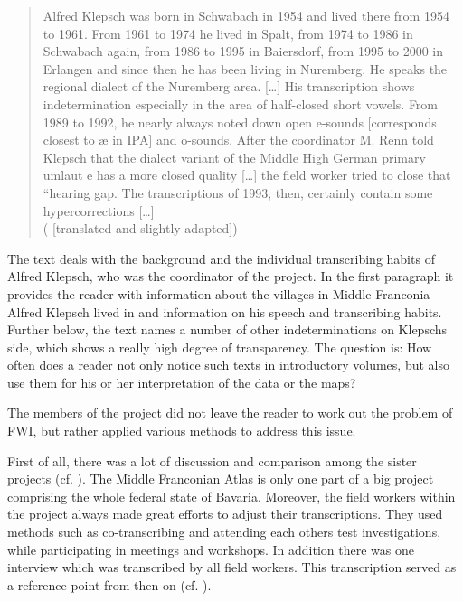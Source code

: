 \documentclass[output=paper]{LSP/langsci}
\begin{document}
\begin{quote}
Alfred Klepsch was born in Schwabach in 1954 and lived there from 1954 to 1961. From 1961 to 1974 he lived in Spalt, from 1974 to 1986 in Schwabach again, from 1986 to 1995 in Baiersdorf, from 1995 to 2000 in Erlangen and since then he has been living in Nuremberg. He speaks the regional dialect of the Nuremberg area. […] His transcription shows indetermination especially in the area of half-closed short vowels. From 1989 to 1992, he nearly always noted down open e-sounds [corresponds closest to æ in IPA] and o-sounds. After the coordinator M. Renn told Klepsch that the dialect variant of the Middle High German primary umlaut e has a more closed quality […] the field worker tried to close that ``hearing gap{\textquotedbl}. The transcriptions of 1993, then, certainly contain some hypercorrections […]\\(\citealt[47]{klepsch_sprachatlas_2013} [translated and slightly adapted])
\end{quote}

The text deals with the background and the individual transcribing habits of Alfred Klepsch, who was the coordinator of the project. In the first paragraph it provides the reader with information about the villages in Middle Franconia Alfred Klepsch lived in and information on his speech and transcribing habits. Further below, the text names a number of other indeterminations on Klepsch{\textquotesingle}s side, which shows a really high degree of transparency. The question is: How often does a reader not only notice such texts in introductory volumes, but also use them for his or her interpretation of the data or the maps?

The members of the project did not leave the reader to work out the problem of FWI, but rather applied various methods to address this issue.

First of all, there was a lot of discussion and comparison among the sister projects (cf. \citealt[25 ff.]{klepsch_wie_2013}). The Middle Franconian Atlas is only one part of a big project comprising the whole federal state of Bavaria. Moreover, the field workers within the project always made great efforts to adjust their transcriptions. They used methods such as co-transcribing and attending each other{\textquotesingle}s test investigations, while participating in meetings and workshops. In addition there was one interview which was transcribed by all field workers. This transcription served as a reference point from then on (cf. \citealt[26]{klepsch_wie_2013}).
\end{document}

